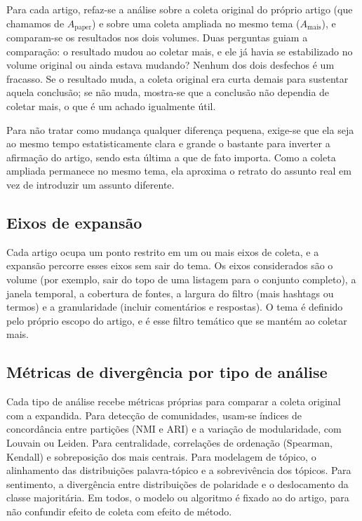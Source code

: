 \documentclass[12pt,a4paper]{article}
\begin{document}
Para cada artigo, refaz-se a análise sobre a coleta original do próprio artigo
(que chamamos de $A_{\text{paper}}$) e sobre uma coleta ampliada no mesmo tema
($A_{\text{mais}}$), e comparam-se os resultados nos dois volumes. Duas perguntas
guiam a comparação: o resultado mudou ao coletar mais, e ele já havia se
estabilizado no volume original ou ainda estava mudando? Nenhum dos dois desfechos
é um fracasso. Se o resultado muda, a coleta original era curta demais para
sustentar aquela conclusão; se não muda, mostra-se que a conclusão não dependia de
coletar mais, o que é um achado igualmente útil.

Para não tratar como mudança qualquer diferença pequena, exige-se que ela seja ao
mesmo tempo estatisticamente clara e grande o bastante para inverter a afirmação do
artigo, sendo esta última a que de fato importa. Como a coleta ampliada permanece
no mesmo tema, ela aproxima o retrato do assunto real em vez de introduzir um
assunto diferente.

\subsection{Eixos de expansão}

Cada artigo ocupa um ponto restrito em um ou mais eixos de coleta, e a expansão
percorre esses eixos sem sair do tema. Os eixos considerados são o volume (por
exemplo, sair do topo de uma listagem para o conjunto completo), a janela
temporal, a cobertura de fontes, a largura do filtro (mais hashtags ou termos) e
a granularidade (incluir comentários e respostas). O tema é definido pelo próprio
escopo do artigo, e é esse filtro temático que se mantém ao coletar mais.

\subsection{Métricas de divergência por tipo de análise}

Cada tipo de análise recebe métricas próprias para comparar a coleta original com
a expandida. Para detecção de comunidades, usam-se índices de concordância entre
partições (NMI e ARI) e a variação de modularidade, com Louvain ou Leiden. Para
centralidade, correlações de ordenação (Spearman, Kendall) e sobreposição dos
mais centrais. Para modelagem de tópico, o alinhamento das distribuições
palavra-tópico e a sobrevivência dos tópicos. Para sentimento, a divergência entre
distribuições de polaridade e o deslocamento da classe majoritária. Em todos, o
modelo ou algoritmo é fixado ao do artigo, para não confundir efeito de coleta com
efeito de método.
\end{document}
